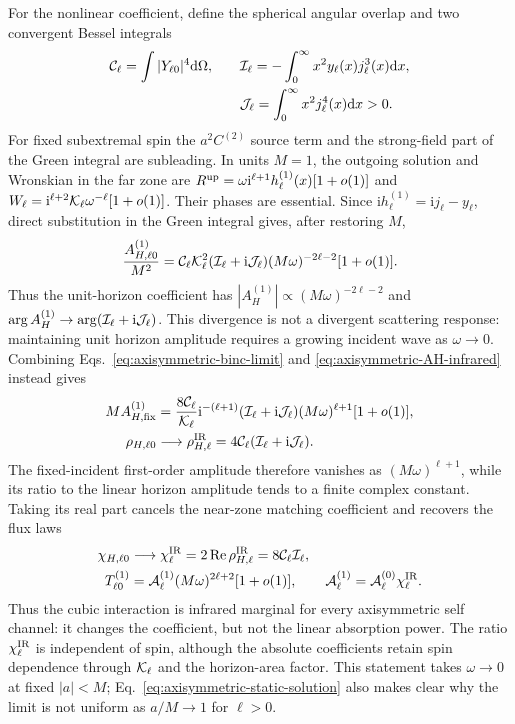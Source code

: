 \documentclass[aps,prd,twocolumn,10pt,nofootinbib,superscriptaddress,floatfix]{revtex4-2}
\newcommand{\dd}{\mathrm{d}}
\newcommand{\ii}{\mathrm{i}}
\begin{document}
For the nonlinear coefficient, define the spherical angular overlap and two
convergent Bessel integrals
\begin{align}
 {\cal C}_\ell=\int|Y_{\ell0}|^4\dd\Omega,
 \qquad &
 {\cal I}_\ell=-\int_0^\infty x^2y_\ell(x)j_\ell^3(x)\dd x ,\nonumber\\
 &{\cal J}_\ell=\int_0^\infty x^2j_\ell^4(x)\dd x>0.
 \label{eq:axisymmetric-infrared-integral}
\end{align}
For fixed subextremal spin the $a^2C^{(2)}$ source term and the strong-field
part of the Green integral are subleading.  In units $M=1$, the outgoing
solution and Wronskian in the far zone are
$R^{\rm up}=\omega\ii^{\ell+1}h_\ell^{(1)}(x)[1+o(1)]$ and
$W_\ell=\ii^{\ell+2}{\cal K}_\ell\omega^{-\ell}[1+o(1)]$.
Their phases are essential.  Since
$\ii h_\ell^{(1)}=\ii j_\ell-y_\ell$, direct substitution in the Green
integral gives, after restoring $M$,
\begin{equation}
 \frac{A_{H,\ell0}^{(1)}}{M^2}
 ={\cal C}_\ell{\cal K}_\ell^2
 ({\cal I}_\ell+\ii{\cal J}_\ell)
 (M\omega)^{-2\ell-2}[1+o(1)].
 \label{eq:axisymmetric-AH-infrared}
\end{equation}
Thus the unit-horizon coefficient has
$|A_H^{(1)}|\propto(M\omega)^{-2\ell-2}$ and
$\arg A_H^{(1)}\to\arg({\cal I}_\ell+\ii{\cal J}_\ell)$.  This divergence is
not a divergent scattering response: maintaining unit horizon amplitude
requires a growing incident wave as $\omega\to0$.  Combining
Eqs.~\eqref{eq:axisymmetric-binc-limit} and
\eqref{eq:axisymmetric-AH-infrared} instead gives
\begin{align}
 M A_{H,{\rm fix}}^{(1)}
 &=\frac{8{\cal C}_\ell}{{\cal K}_\ell}\ii^{-(\ell+1)}
 ({\cal I}_\ell+\ii{\cal J}_\ell)
 (M\omega)^{\ell+1}[1+o(1)],\nonumber\\
 \rho_{H,\ell0}
 &\longrightarrow\rho^{\rm IR}_{H,\ell}
 =4{\cal C}_\ell({\cal I}_\ell+\ii{\cal J}_\ell).
 \label{eq:axisymmetric-complex-response}
\end{align}
The fixed-incident first-order amplitude therefore vanishes as
$(M\omega)^{\ell+1}$, while its ratio to the linear horizon amplitude tends
to a finite complex constant.  Taking its real part cancels the near-zone
matching coefficient and recovers the flux laws
\begin{align}
 \chi_{H,\ell0}
 &\longrightarrow \chi^{\rm IR}_\ell
 =2\operatorname{Re}\rho^{\rm IR}_{H,\ell}
 =8{\cal C}_\ell{\cal I}_\ell,\nonumber\\
 T^{(1)}_{\ell0}
 &={\cal A}^{(1)}_\ell(M\omega)^{2\ell+2}[1+o(1)],
 \qquad
 {\cal A}^{(1)}_\ell={\cal A}^{(0)}_\ell\chi^{\rm IR}_\ell .
 \label{eq:axisymmetric-T1-infrared}
\end{align}
Thus the cubic interaction is infrared marginal for every axisymmetric
self channel: it changes the coefficient, but not the linear absorption
power.  The ratio $\chi^{\rm IR}_\ell$ is independent of spin, although the
absolute coefficients retain spin dependence through ${\cal K}_\ell$ and the
horizon-area factor.  This statement takes $\omega\to0$ at fixed $|a|<M$;
Eq.~\eqref{eq:axisymmetric-static-solution} also makes clear why the limit is
not uniform as $a/M\to1$ for $\ell>0$.
\end{document}
